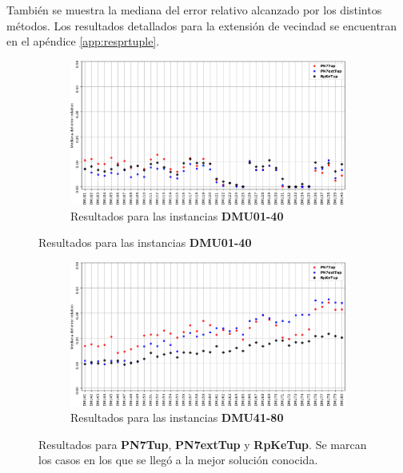 También se muestra la mediana del error relativo alcanzado por los distintos métodos. Los resultados detallados para la extensión de vecindad se encuentran en el apéndice \ref{app:resprtuple}.

\begin{figure}[hbtp]
    \begin{subfigure}{\textwidth}
        \centering
        \includegraphics[scale=.6]{Imagenes/prvsn7vsn8err1.png}
        \caption{Resultados para las instancias \textbf{DMU01-40}}
    \end{subfigure}
\end{figure}
\begin{figure}[H]\ContinuedFloat
    \begin{subfigure}{\textwidth}
        \centering
        \includegraphics[scale=.6]{Imagenes/prvsn7vsn8err2.png}
        \caption{Resultados para las instancias \textbf{DMU41-80}}
    \end{subfigure}
    \caption{Resultados para \textbf{PN7Tup}, \textbf{PN7extTup} y \textbf{RpKeTup}. Se marcan los casos en los que se llegó a la mejor solución conocida.}
    \label{fig:n7vsn8vsprerr}
\end{figure}


